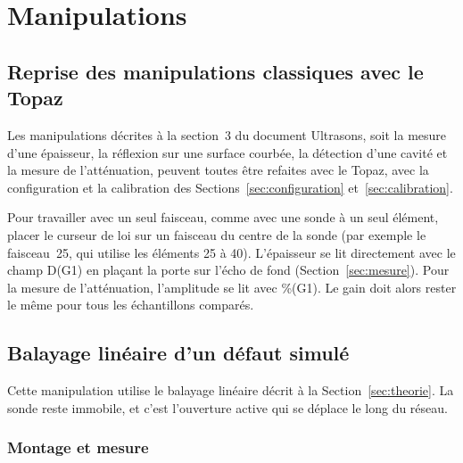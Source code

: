 \documentclass[11pt,letterpaper]{article}
\begin{document}
\section{Manipulations}
\label{sec:manipulations}

\subsection{Reprise des manipulations classiques avec le Topaz}

Les manipulations d\'ecrites \`a la section~3 du document Ultrasons, soit la mesure d'une \'epaisseur, la r\'eflexion sur une surface courb\'ee, la d\'etection d'une cavit\'e et la mesure de l'att\'enuation, peuvent toutes \^etre refaites avec le Topaz, avec la configuration et la calibration des Sections~\ref{sec:configuration} et~\ref{sec:calibration}.

Pour travailler avec un seul faisceau, comme avec une sonde \`a un seul \'el\'ement, placer le curseur de loi sur un faisceau du centre de la sonde (par exemple le faisceau~25, qui utilise les \'el\'ements 25 \`a 40). L'\'epaisseur se lit directement avec le champ D(G1) en pla\c cant la porte sur l'\'echo de fond (Section~\ref{sec:mesure}). Pour la mesure de l'att\'enuation, l'amplitude se lit avec \%(G1). Le gain doit alors rester le m\^eme pour tous les \'echantillons compar\'es.

\subsection{Balayage lin\'eaire d'un d\'efaut simul\'e}
\label{sec:manip-lineaire}

Cette manipulation utilise le balayage lin\'eaire d\'ecrit \`a la Section~\ref{sec:theorie}. La sonde reste immobile, et c'est l'ouverture active qui se d\'eplace le long du r\'eseau.

\subsubsection*{Montage et mesure}
\end{document}
